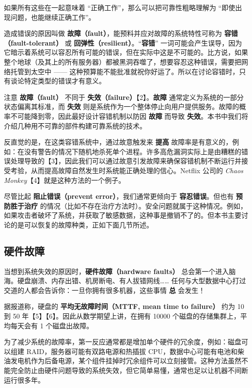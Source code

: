 如果所有这些在一起意味着 “正确工作”，那么可以把可靠性粗略理解为 “即使出现问题，也能继续正确工作”。

造成错误的原因叫做 \textbf{故障（fault）}，能预料并应对故障的系统特性可称为 \textbf{容错（fault-tolerant）} 或 \textbf{回弹性（resilient）}。“\textbf{容错}” 一词可能会产生误导，因为它暗示着系统可以容忍所有可能的错误，但在实际中这是不可能的。比方说，如果整个地球（及其上的所有服务器）都被黑洞吞噬了，想要容忍这种错误，需要把网络托管到太空中 —— 这种预算能不能批准就祝你好运了。所以在讨论容错时，只有谈论特定类型的错误才有意义。

注意 \textbf{故障（fault）} 不同于 \textbf{失效（failure）}【2】。\textbf{故障} 通常定义为系统的一部分状态偏离其标准，而 \textbf{失效} 则是系统作为一个整体停止向用户提供服务。故障的概率不可能降到零，因此最好设计容错机制以防因 \textbf{故障} 而导致 \textbf{失效}。本书中我们将介绍几种用不可靠的部件构建可靠系统的技术。

反直觉的是，在这类容错系统中，通过故意触发来 \textbf{提高} 故障率是有意义的，例如：在没有警告的情况下随机地杀死单个进程。许多高危漏洞实际上是由糟糕的错误处理导致的【3】，因此我们可以通过故意引发故障来确保容错机制不断运行并接受考验，从而提高故障自然发生时系统能正确处理的信心。Netflix 公司的 \textit{Chaos Monkey}【4】就是这种方法的一个例子。

尽管比起 \textbf{阻止错误（prevent error）}，我们通常更倾向于 \textbf{容忍错误}。但也有 \textbf{预防胜于治疗} 的情况（比如不存在治疗方法时）。安全问题就属于这种情况。例如，如果攻击者破坏了系统，并获取了敏感数据，这种事是撤销不了的。但本书主要讨论的是可以恢复的故障种类，正如下面几节所述。

\subsection{硬件故障}

当想到系统失效的原因时，\textbf{硬件故障（hardware faults）} 总会第一个进入脑海。硬盘崩溃、内存出错、机房断电、有人拔错网线…… 任何与大型数据中心打过交道的人都会告诉你：一旦你拥有很多机器，这些事情 \textbf{总} 会发生！

据报道称，硬盘的 \textbf{平均无故障时间（MTTF, mean time to failure）} 约为 10 到 50 年【5】【6】。因此从数学期望上讲，在拥有 10000 个磁盘的存储集群上，平均每天会有 1 个磁盘出故障。

为了减少系统的故障率，第一反应通常都是增加单个硬件的冗余度，例如：磁盘可以组建 RAID，服务器可能有双路电源和热插拔 CPU，数据中心可能有电池和柴油发电机作为后备电源，某个组件挂掉时冗余组件可以立刻接管。这种方法虽然不能完全防止由硬件问题导致的系统失效，但它简单易懂，通常也足以让机器不间断运行很多年。


